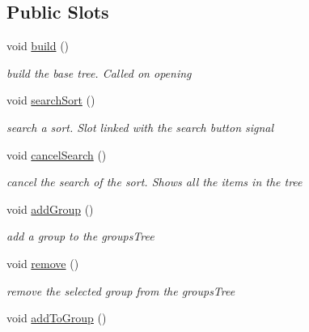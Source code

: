 \subsection*{Public Slots}
\begin{DoxyCompactItemize}
\item 
\hypertarget{classTreeArea_a8fd7c22b1c8c4e8cb9503731d66c5d47}{void \hyperlink{classTreeArea_a8fd7c22b1c8c4e8cb9503731d66c5d47}{build} ()}\label{classTreeArea_a8fd7c22b1c8c4e8cb9503731d66c5d47}

\begin{DoxyCompactList}\small\item\em build the base tree. Called on opening \end{DoxyCompactList}\item 
\hypertarget{classTreeArea_aee1ca64b79821f9cbcc023861e169e33}{void \hyperlink{classTreeArea_aee1ca64b79821f9cbcc023861e169e33}{search\+Sort} ()}\label{classTreeArea_aee1ca64b79821f9cbcc023861e169e33}

\begin{DoxyCompactList}\small\item\em search a sort. Slot linked with the search button signal \end{DoxyCompactList}\item 
\hypertarget{classTreeArea_a4dc4bffd318bcf5a4023ec92a4932214}{void \hyperlink{classTreeArea_a4dc4bffd318bcf5a4023ec92a4932214}{cancel\+Search} ()}\label{classTreeArea_a4dc4bffd318bcf5a4023ec92a4932214}

\begin{DoxyCompactList}\small\item\em cancel the search of the sort. Shows all the items in the tree \end{DoxyCompactList}\item 
\hypertarget{classTreeArea_a1825d29fa6bd5fbf4e8c0a4f657284bd}{void \hyperlink{classTreeArea_a1825d29fa6bd5fbf4e8c0a4f657284bd}{add\+Group} ()}\label{classTreeArea_a1825d29fa6bd5fbf4e8c0a4f657284bd}

\begin{DoxyCompactList}\small\item\em add a group to the groups\+Tree \end{DoxyCompactList}\item 
\hypertarget{classTreeArea_af231946c277606cf3613f82ffd859a01}{void \hyperlink{classTreeArea_af231946c277606cf3613f82ffd859a01}{remove} ()}\label{classTreeArea_af231946c277606cf3613f82ffd859a01}

\begin{DoxyCompactList}\small\item\em remove the selected group from the groups\+Tree \end{DoxyCompactList}\item 
\hypertarget{classTreeArea_a47f535fca68dd94484227f4669cc773d}{void \hyperlink{classTreeArea_a47f535fca68dd94484227f4669cc773d}{add\+To\+Group} ()}\label{classTreeArea_a47f535fca68dd94484227f4669cc773d}


\end{DoxyCompactItemize}

